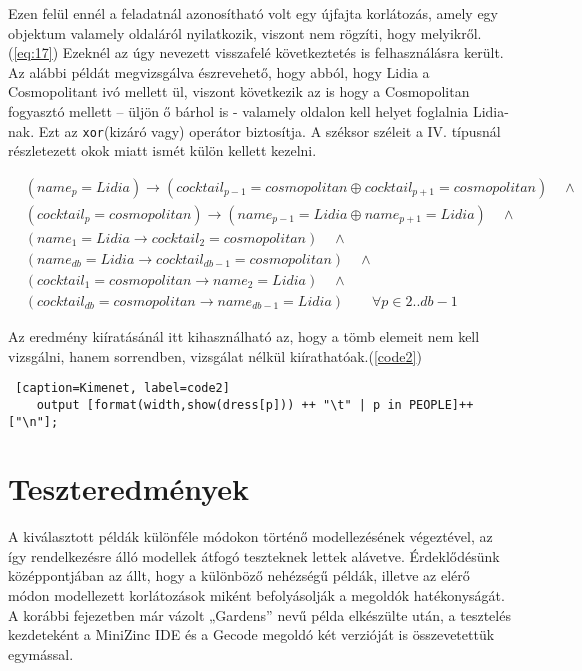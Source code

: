 \documentclass[12pt,a4paper]{report}
\begin{document}
    Ezen felül ennél a feladatnál azonosítható volt egy újfajta korlátozás, amely egy objektum valamely oldaláról nyilatkozik, viszont nem rögzíti, hogy melyikről.(\ref{eq:17})
    Ezeknél az úgy nevezett visszafelé következtetés is felhasználásra került.
    Az alábbi példát megvizsgálva észrevehető, hogy abból, hogy Lidia a Cosmopolitant ivó mellett ül, viszont következik az is hogy a Cosmopolitan fogyasztó mellett – üljön ő bárhol is - valamely oldalon kell helyet foglalnia Lidia-nak.
    Ezt az \texttt{xor}(kizáró vagy) operátor biztosítja.
    A széksor széleit a IV. típusnál részletezett okok miatt ismét külön kellett kezelni.

    \begin{equation} \label{eq:17}
    \begin{aligned}
     &(name_p=Lidia) \rightarrow (cocktail_{p-1}=cosmopolitan \oplus cocktail_{p+1}=cosmopolitan) \quad \wedge \\
   	 &(cocktail_p=cosmopolitan) \rightarrow (name_{p-1}=Lidia \oplus name_{p+1}=Lidia) \quad \wedge \\
     &(name_1=Lidia \rightarrow cocktail_2=cosmopolitan) \quad \wedge \\
     &(name_{db}=Lidia \rightarrow cocktail_{db-1}=cosmopolitan) \quad \wedge \\
     &(cocktail_1= cosmopolitan \rightarrow name_2=Lidia) \quad \wedge \\
     &(cocktail_{db}=cosmopolitan \rightarrow name_{db-1}=Lidia) \quad \quad \forall p \in 2..db-1
     \end{aligned}
    \end{equation} 
    
    Az eredmény kiíratásánál itt kihasználható az, hogy a tömb elemeit nem kell vizsgálni, hanem sorrendben, vizsgálat nélkül kiírathatóak.(\ref{code2})
	
	\begin{lstlisting} [caption=Kimenet, label=code2]
	output [format(width,show(dress[p])) ++ "\t" | p in PEOPLE]++["\n"];\end{lstlisting}

\section{Teszteredmények}

    A kiválasztott példák különféle módokon történő modellezésének végeztével, az így rendelkezésre álló modellek átfogó teszteknek lettek alávetve.
    Érdeklődésünk középpontjában az állt, hogy a különböző nehézségű példák, illetve az elérő módon modellezett korlátozások miként befolyásolják a megoldók hatékonyságát.
    A korábbi fejezetben már vázolt „Gardens” nevű példa elkészülte után, a tesztelés kezdeteként a MiniZinc IDE és a Gecode megoldó két verzióját is összevetettük egymással.
\end{document}
